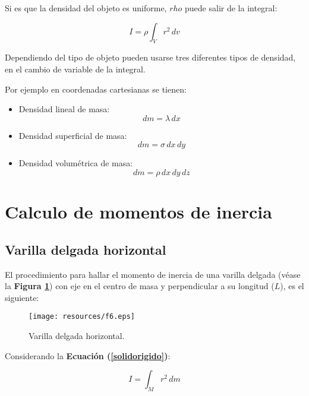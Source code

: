 \documentclass[letter,oneside,11pt]{article}
\begin{document}
Si es que la densidad del objeto es uniforme, $rho$ puede salir de la integral:

\begin{equation}
    I = \rho \int_{V} r^2\, dv
\end{equation}

Dependiendo del tipo de objeto pueden usarse tres diferentes tipos de densidad,
en el cambio de variable de la integral.

Por ejemplo en coordenadas cartesianas se tienen:

\begin{itemize}
\item Densidad lineal de masa:
\begin{equation*}
    dm = \lambda\, dx
\end{equation*}

\item Densidad superficial de masa:
\begin{equation*}
    dm = \sigma\, dx\, dy
\end{equation*}

\item Densidad volumétrica de masa:
\begin{equation*}
    dm = \rho\, dx\, dy\, dz
\end{equation*}
\end{itemize}

\section{Calculo de momentos de inercia}

\subsection{Varilla delgada horizontal}
El procedimiento para hallar el momento de inercia de una varilla delgada (véase
la \textbf{Figura \ref{figura6}}) con eje en el centro de masa y perpendicular a
su longitud ($L$), es el siguiente:

\begin{figure}
\centering
\texttt{[image: resources/f6.eps]}
\caption{Varilla delgada horizontal.}
\label{figura6}
\end{figure}

Considerando la \textbf{Ecuación (\ref{solidorigido})}:

\begin{equation*}
    I = \int_{M} r^2\, dm
\tag{4}
\end{equation*}
\end{document}
